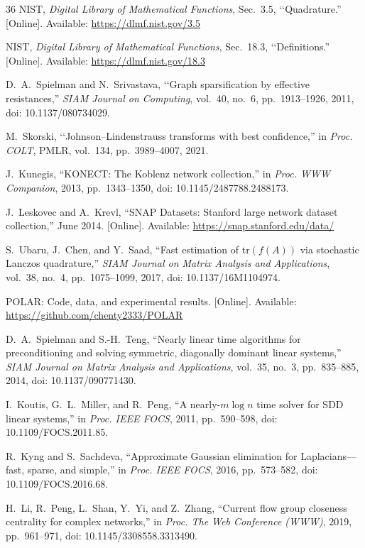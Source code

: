 \documentclass[conference]{IEEEtran}
\theoremstyle{definition}
\newcommand{\POLAR}{\textsc{POLAR}}
\begin{document}
\begin{thebibliography}{36}
NIST, \emph{Digital Library of Mathematical Functions},
Sec.~3.5, \lq\lq{}Quadrature.''
[Online]. Available: \url{https://dlmf.nist.gov/3.5}

NIST, \emph{Digital Library of Mathematical Functions},
Sec.~18.3, \lq\lq{}Definitions.''
[Online]. Available: \url{https://dlmf.nist.gov/18.3}

D.~A.~Spielman and N.~Srivastava,
\lq\lq{}Graph sparsification by effective resistances,''
\emph{SIAM Journal on Computing}, vol.~40, no.~6,
pp.~1913--1926, 2011, doi: 10.1137/080734029.

M.~Skorski,
\lq\lq{}Johnson--Lindenstrauss transforms with best confidence,''
in \emph{Proc. COLT}, PMLR, vol.~134, pp.~3989--4007, 2021.

J.~Kunegis,
``KONECT: The Koblenz network collection,''
in \emph{Proc. WWW Companion}, 2013, pp.~1343--1350,
doi: 10.1145/2487788.2488173.

J.~Leskovec and A.~Krevl,
``SNAP Datasets: Stanford large network dataset collection,''
June 2014. [Online]. Available: \url{https://snap.stanford.edu/data/}

S.~Ubaru, J.~Chen, and Y.~Saad,
``Fast estimation of $\mathrm{tr}(f(A))$ via stochastic Lanczos quadrature,''
\emph{SIAM Journal on Matrix Analysis and Applications}, vol.~38, no.~4,
pp.~1075--1099, 2017, doi: 10.1137/16M1104974.

\POLAR{}: Code, data, and experimental results. [Online]. Available: \url{https://github.com/chenty2333/POLAR}

D.~A.~Spielman and S.-H.~Teng,
``Nearly linear time algorithms for preconditioning and solving symmetric, diagonally dominant linear systems,''
\emph{SIAM Journal on Matrix Analysis and Applications}, vol.~35, no.~3,
pp.~835--885, 2014, doi: 10.1137/090771430.

I.~Koutis, G.~L.~Miller, and R.~Peng,
``A nearly-$m\log n$ time solver for SDD linear systems,''
in \emph{Proc. IEEE FOCS}, 2011, pp.~590--598,
doi: 10.1109/FOCS.2011.85.

R.~Kyng and S.~Sachdeva,
``Approximate Gaussian elimination for Laplacians---fast, sparse, and simple,''
in \emph{Proc. IEEE FOCS}, 2016, pp.~573--582,
doi: 10.1109/FOCS.2016.68.

H.~Li, R.~Peng, L.~Shan, Y.~Yi, and Z.~Zhang,
``Current flow group closeness centrality for complex networks,''
in \emph{Proc. The Web Conference (WWW)}, 2019,
pp.~961--971, doi: 10.1145/3308558.3313490.


\end{thebibliography}
\end{document}
